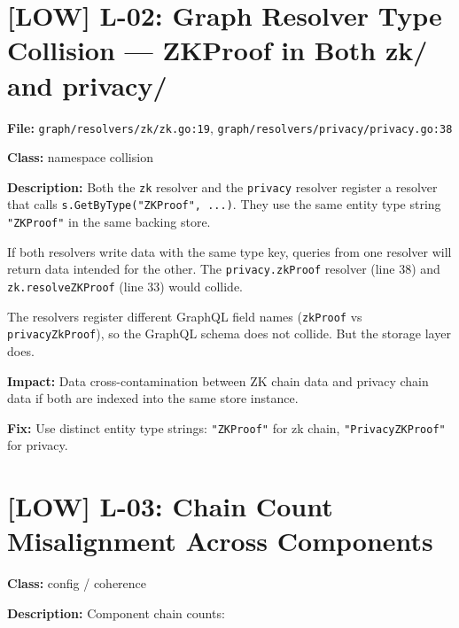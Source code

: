 \documentclass{article}
\begin{document}
\section{[LOW] L-02: Graph Resolver Type Collision --- ZKProof in Both zk/ and privacy/}

\textbf{File:} \texttt{graph/resolvers/zk/zk.go:19},
\texttt{graph/resolvers/privacy/privacy.go:38}

\textbf{Class:} namespace collision

\textbf{Description:}
Both the \texttt{zk} resolver and the \texttt{privacy} resolver register
a resolver that calls \texttt{s.GetByType("ZKProof", ...)}.
They use the same entity type string \texttt{"ZKProof"} in the same
backing store.

If both resolvers write data with the same type key, queries from one
resolver will return data intended for the other. The
\texttt{privacy.zkProof} resolver (line 38) and \texttt{zk.resolveZKProof}
(line 33) would collide.

The resolvers register different GraphQL field names (\texttt{zkProof} vs
\texttt{privacyZkProof}), so the GraphQL schema does not collide. But the
storage layer does.

\textbf{Impact:} Data cross-contamination between ZK chain data and privacy
chain data if both are indexed into the same store instance.

\textbf{Fix:} Use distinct entity type strings:
\texttt{"ZKProof"} for zk chain, \texttt{"PrivacyZKProof"} for privacy.


\section{[LOW] L-03: Chain Count Misalignment Across Components}

\textbf{Class:} config / coherence

\textbf{Description:}
Component chain counts:
\end{document}
